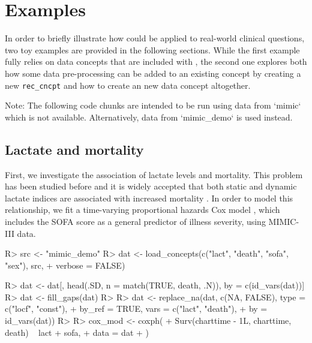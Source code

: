 \documentclass[
  notitle]{jss}
\begin{document}
\hypertarget{examples}{%
\section{Examples}\label{examples}}

In order to briefly illustrate how  could be applied to
real-world clinical questions, two toy examples are provided in the
following sections. While the first example fully relies on data
concepts that are included with , the second one explores both
how some data pre-processing can be added to an existing concept by
creating a new \texttt{rec\_cncpt} and how to create an new data concept
altogether.

\begin{CodeChunk}
\begin{CodeOutput}
Note: The following code chunks are intended to be run using data from
`mimic` which is not available. Alternatively, data from `mimic_demo`
is used instead.
\end{CodeOutput}
\end{CodeChunk}

\hypertarget{lactate-and-mortality}{%
\subsection{Lactate and mortality}\label{lactate-and-mortality}}

First, we investigate the association of lactate levels and mortality.
This problem has been studied before and it is widely accepted that both
static and dynamic lactate indices are associated with increased
mortality \citep{haas2016, nichol2011, van2013}. In order to model this
relationship, we fit a time-varying proportional hazards Cox model
\citep{therneau2000, therneau2015}, which includes the SOFA score as a
general predictor of illness severity, using MIMIC-III data.

\begin{CodeChunk}
\begin{CodeInput}
R> src <- "mimic_demo"
R> dat <- load_concepts(c("lact", "death", "sofa", "sex"), src,
+                      verbose = FALSE)
\end{CodeInput}
\end{CodeChunk}

\begin{CodeChunk}
\begin{CodeInput}
R> dat <- dat[, head(.SD, n = match(TRUE, death, .N)), by = c(id_vars(dat))]
R> dat <- fill_gaps(dat)
R> 
R> dat <- replace_na(dat, c(NA, FALSE), type = c("locf", "const"),
+                   by_ref = TRUE, vars = c("lact", "death"),
+                   by = id_vars(dat))
R> 
R> cox_mod <- coxph(
+   Surv(charttime - 1L, charttime, death) ~ lact + sofa,
+   data = dat
+ )
\end{CodeInput}
\end{CodeChunk}
\end{document}
